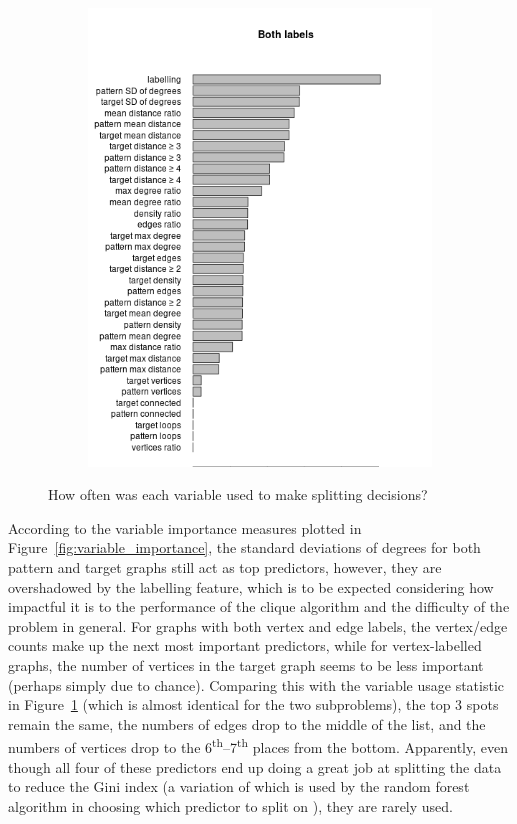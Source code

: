 \documentclass{l4proj}
\theoremstyle{definition}
\theoremstyle{remark}
\begin{document}
\begin{figure}
\begin{subfigure}[t]{0.49\textwidth}
    \includegraphics[width=\textwidth]{images/both_labels_var_used.png}
  \end{subfigure}
  \caption{How often was each variable used to make splitting decisions?}
  \label{fig:var_used}
\end{figure}

According to the variable importance measures plotted in
Figure~\ref{fig:variable_importance}, the standard deviations of degrees for
both pattern and target graphs still act as top predictors, however, they are
overshadowed by the labelling feature, which is to be expected considering how
impactful it is to the performance of the clique algorithm and the difficulty of
the problem in general. For graphs with both vertex and edge labels, the
vertex/edge counts make up the next most important predictors, while for
vertex-labelled graphs, the number of vertices in the target graph seems to be
less important (perhaps simply due to chance). Comparing this with the variable
usage statistic in Figure~\ref{fig:var_used} (which is almost identical for the
two subproblems), the top 3 spots remain the same, the numbers of edges drop to
the middle of the list, and the numbers of vertices drop to the
6\textsuperscript{th}--7\textsuperscript{th} places from the bottom. Apparently,
even though all four of these predictors end up doing a great job at splitting
the data to reduce the Gini index (a variation of which is used by the random
forest algorithm in choosing which predictor to split on \cite{167153}), they
are rarely used. 
\end{document}
